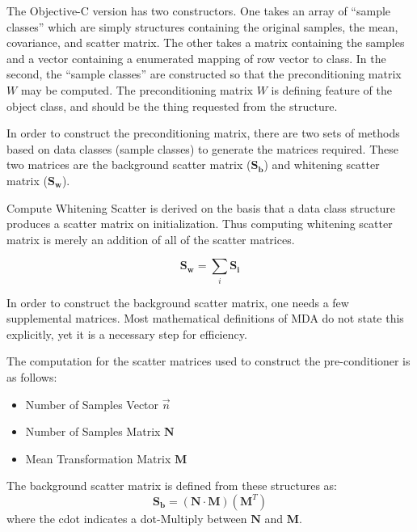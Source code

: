 The Objective-C version has two constructors.  One takes an array of ``sample classes'' which are simply structures containing the original samples, the mean, covariance, and scatter matrix.  The other takes a matrix containing the samples and a vector containing a enumerated mapping of row vector to class.    In the second, the ``sample classes'' are constructed so that the preconditioning matrix $W$ may be computed.  The preconditioning matrix $W$ is defining feature of the object class, and should be the thing requested from the structure.  

In order to construct the preconditioning matrix, there are two sets of methods based on data classes (sample classes) to generate the matrices required.  These two matrices are the background scatter matrix ($\mathbf{S_b}$) and whitening scatter matrix ($\mathbf{S_w}$).  

Compute Whitening Scatter is derived on the basis that a data class structure produces a scatter matrix on initialization.  Thus computing whitening scatter matrix is merely an addition of all of the scatter matrices.  

\begin{equation}
\mathbf{S_w} = \sum _i \mathbf{S_i}
\end{equation}

In order to construct the background scatter matrix, one needs a few supplemental matrices.  Most mathematical definitions of MDA do not state this explicitly, yet it is a necessary step for efficiency.  

The computation for the scatter matrices used to construct the pre-conditioner is as follows:
\begin{itemize}
	\item Number of Samples Vector $\vec{n}$
	\item Number of Samples Matrix $\mathbf{N}$
	\item Mean Transformation Matrix $\mathbf{M}$
\end{itemize}
The background scatter matrix is defined from these structures as:
\begin{equation}
	\mathbf{S_b} = (\mathbf{N} \cdot \mathbf{M})(\mathbf{M}^T) 
\end{equation}
where the cdot indicates a dot-Multiply between $\mathbf{N}$ and $\mathbf{M}$.  %

